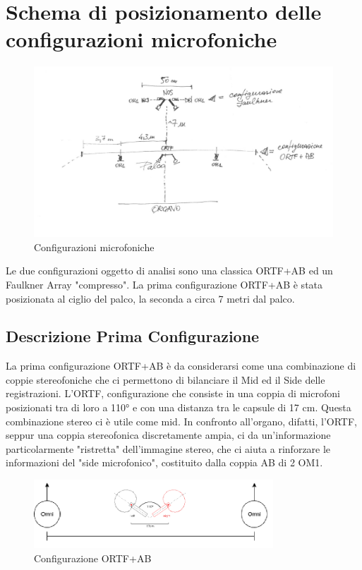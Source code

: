 \documentclass{article}
\begin{document}
\section{Schema di posizionamento delle configurazioni microfoniche}
    \begin{figure}[H]
        \centering
        \includegraphics[width=1\textwidth]{images/schema.jpg}
        \caption{\label{fig8}Configurazioni microfoniche}
    \end{figure}
    
    Le due configurazioni oggetto di analisi sono una classica ORTF+AB ed un Faulkner Array "compresso".
    La prima configurazione ORTF+AB è stata posizionata al ciglio del palco, la seconda a circa 7 metri dal palco.
    
    \subsection{Descrizione Prima Configurazione}
        La prima configurazione ORTF+AB è da considerarsi come una combinazione di coppie stereofoniche che ci permettono di bilanciare il Mid ed il Side delle registrazioni. L'ORTF, configurazione che consiste in una coppia di microfoni posizionati tra di loro a 110° e con una distanza tra le capsule di 17 cm. Questa combinazione stereo ci è utile come mid. In confronto all'organo, difatti, l'ORTF, seppur una coppia stereofonica discretamente ampia, ci da un'informazione particolarmente "ristretta" dell'immagine stereo, che ci aiuta a rinforzare le informazioni del "side microfonico", costituito dalla coppia AB di 2 OM1.
    
        \begin{figure}[H]
            \centering
            \includegraphics[width=0.8\textwidth]{images/ortfab.png}
            \caption{\label{fig9}Configurazione ORTF+AB}
        \end{figure}
    \endsubsection
        
\end{document}
